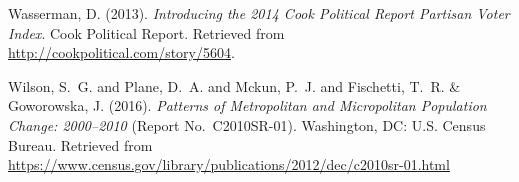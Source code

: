 \documentclass[draft]{agujournal}\usepackage{knitr}
\begin{document}
\begin{thebibliography}{33}
  Wasserman, D. (2013).
  \textit{Introducing the 2014 {C}ook {P}olitical {R}eport {P}artisan {V}oter
  {I}ndex}.
  Cook Political Report.
  Retrieved from
  \url{http://cookpolitical.com/story/5604}.

  Wilson, S.~G. and Plane, D.~A. and Mckun, P.~J. and Fischetti, T.~R. \&
  Goworowska, J. (2016).
  \textit{Patterns of Metropolitan and Micropolitan Population Change: 2000--2010\/}
  (Report No.~C2010SR-01).
  Washington, DC:  U.S. Census Bureau.
  Retrieved from
  \url{https://www.census.gov/library/publications/2012/dec/c2010sr-01.html}

\end{thebibliography}

\listofchanges
\end{document}
